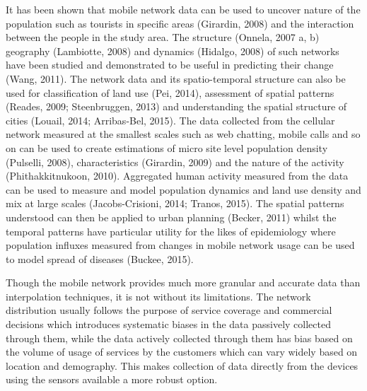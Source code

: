 It has been shown that mobile network data can be used to uncover nature of the
population such as tourists in specific areas (Girardin, 2008) and the
interaction between the people in the study area. The structure (Onnela, 2007 a,
b) geography (Lambiotte, 2008) and dynamics (Hidalgo, 2008) of such networks
have been studied and demonstrated to be useful in predicting their change
(Wang, 2011). The network data and its spatio-temporal structure can also be
used for classification of land use (Pei, 2014), assessment of spatial patterns
(Reades, 2009; Steenbruggen, 2013) and understanding the spatial structure of
cities (Louail, 2014; Arribas-Bel, 2015). The data collected from the cellular
network measured at the smallest scales such as web chatting, mobile calls and
so on can be used to create estimations of micro site level population density
(Pulselli, 2008), characteristics (Girardin, 2009) and the nature of the
activity (Phithakkitnukoon, 2010). Aggregated human activity measured from the
data can be used to measure and model population dynamics and land use density
and mix at large scales (Jacobs-Crisioni, 2014; Tranos, 2015). The spatial
patterns understood can then be applied to urban planning (Becker, 2011) whilst
the temporal patterns have particular utility for the likes of epidemiology
where population influxes measured from changes in mobile network usage can be
used to model spread of diseases (Buckee, 2015).


Though the mobile network provides much more granular and accurate data than
interpolation techniques, it is not without its limitations. The network
distribution usually follows the purpose of service coverage and commercial
decisions which introduces systematic biases in the data passively collected
through them, while the data actively collected through them has bias based on
the volume of usage of services by the customers which can vary widely based on
location and demography. This makes collection of data directly from the devices
using the sensors available a more robust option.


